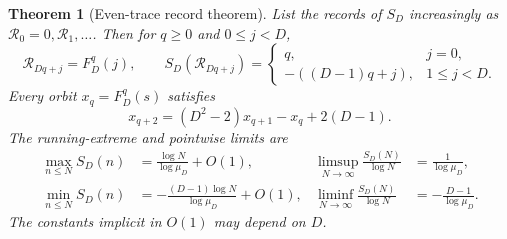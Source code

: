 \documentclass[11pt]{article}
\newtheorem{theorem}{Theorem}[section]
\theoremstyle{definition}
\numberwithin{equation}{section}
\newcommand{\Rs}{\mathcal R}
\begin{document}
\begin{theorem}[Even-trace record theorem]\label{thm:general}
List the records of $S_D$ increasingly as $\Rs_0=0,\Rs_1,\ldots$. Then for $q\ge0$ and $0\le j<D$,
\begin{equation}\label{eq:generalrecords}
 \Rs_{Dq+j}=F_D^q(j),\qquad
 S_D(\Rs_{Dq+j})=
 \begin{cases}q,&j=0,\\-((D-1)q+j),&1\le j<D.\end{cases}
\end{equation}
Every orbit $x_q=F_D^q(s)$ satisfies
\begin{equation}\label{eq:generalscalar}
 x_{q+2}=(D^2-2)x_{q+1}-x_q+2(D-1).
\end{equation}
The running-extreme and pointwise limits are
\begin{align}
 \max_{n\le N}S_D(n)&=\frac{\log N}{\log\mu_D}+O(1),&
 \limsup_{N\to\infty}\frac{S_D(N)}{\log N}&=\frac1{\log\mu_D},\label{eq:generalmax}\\
 \min_{n\le N}S_D(n)&=-\frac{(D-1)\log N}{\log\mu_D}+O(1),&
 \liminf_{N\to\infty}\frac{S_D(N)}{\log N}&=-\frac{D-1}{\log\mu_D}.\label{eq:generalmin}
\end{align}
The constants implicit in $O(1)$ may depend on $D$.
\end{theorem}
\end{document}
